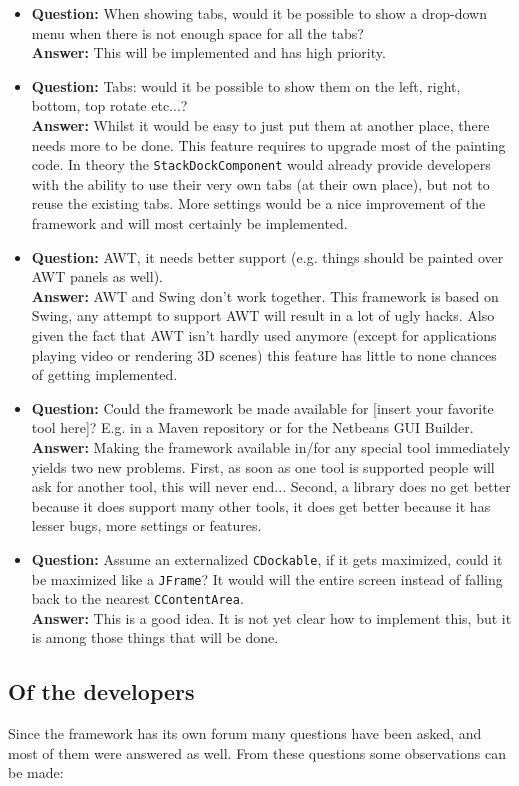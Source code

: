 \documentclass[a4paper,10pt]{article}
\newcommand{\src}[1]{\texttt{#1}}
\newcommand{\qa}[2]{\item \textbf{Question:} #1 \\ \textbf{Answer:} #2}
\begin{document}
\begin{itemize}
 \qa{When showing tabs, would it be possible to show a drop-down menu when there is not enough space for all the tabs?}{This will be implemented and has high priority.}
 
 \qa{Tabs: would it be possible to show them on the left, right, bottom, top rotate etc...?}{Whilst it would be easy to just put them at another place, there needs more to be done. This feature requires to upgrade most of the painting code. In theory the \src{StackDockComponent} would already provide developers with the ability to use their very own tabs (at their own place), but not to reuse the existing tabs. More settings would be a nice improvement of the framework and will most certainly be implemented.}
 
 \qa{AWT, it needs better support (e.g. things should be painted over AWT panels as well).}{AWT and Swing don't work together. This framework is based on Swing, any attempt to support AWT will result in a lot of ugly hacks. Also given the fact that AWT isn't hardly used anymore (except for applications playing video or rendering 3D scenes) this feature has little to none chances of getting implemented.}
 
  \qa{Could the framework be made available for [insert your favorite tool here]? E.g. in a Maven repository or for the Netbeans GUI Builder.}{Making the framework available in/for any special tool immediately yields two new problems. First, as soon as one tool is supported people will ask for another tool, this will never end... Second, a library does no get better because it does support many other tools, it does get better because it has lesser bugs, more settings or features.}
 
 \qa{Assume an externalized \src{CDockable}, if it gets maximized, could it be maximized like a \src{JFrame}? It would will the entire screen instead of falling back to the nearest \src{CContentArea}.}{This is a good idea. It is not yet clear how to implement this, but it is among those things that will be done.}
 
\end{itemize}

\subsection{Of the developers}
Since the framework has its own forum many questions have been asked, and most of them were answered as well. From these questions some observations can be made:
\end{document}
